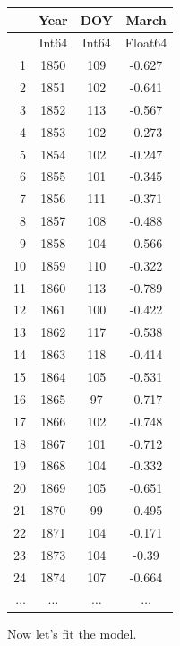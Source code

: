 \documentclass[
  letterpaper,
  DIV=11,
  numbers=noendperiod]{scrartcl}
\begin{document}
\begin{tabular}{r|ccc}
    & Year & DOY & March\\
    \hline
    & Int64 & Int64 & Float64\\
    \hline
    1 & 1850 & 109 & -0.627 \\
    2 & 1851 & 102 & -0.641 \\
    3 & 1852 & 113 & -0.567 \\
    4 & 1853 & 102 & -0.273 \\
    5 & 1854 & 102 & -0.247 \\
    6 & 1855 & 101 & -0.345 \\
    7 & 1856 & 111 & -0.371 \\
    8 & 1857 & 108 & -0.488 \\
    9 & 1858 & 104 & -0.566 \\
    10 & 1859 & 110 & -0.322 \\
    11 & 1860 & 113 & -0.789 \\
    12 & 1861 & 100 & -0.422 \\
    13 & 1862 & 117 & -0.538 \\
    14 & 1863 & 118 & -0.414 \\
    15 & 1864 & 105 & -0.531 \\
    16 & 1865 & 97 & -0.717 \\
    17 & 1866 & 102 & -0.748 \\
    18 & 1867 & 101 & -0.712 \\
    19 & 1868 & 104 & -0.332 \\
    20 & 1869 & 105 & -0.651 \\
    21 & 1870 & 99 & -0.495 \\
    22 & 1871 & 104 & -0.171 \\
    23 & 1873 & 104 & -0.39 \\
    24 & 1874 & 107 & -0.664 \\
    $\dots$ & $\dots$ & $\dots$ & $\dots$ \\
\end{tabular}

Now let's fit the model.
\end{document}
